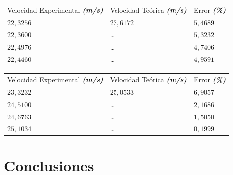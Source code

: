 \documentclass[twocolumn, 12pt]{article}
\newcommand{\bolditalic}[1]{\textbf{\textit{#1}}}
\begin{document}
\begin{table}[H]
    \begin{tabularx}{0.9\linewidth}{|>{\centering\arraybackslash}X|>{\centering\arraybackslash}X|>{\centering\arraybackslash}X|}
        \multicolumn{3}{c}{\large $M_{2}$}                                                                         \\\hline
        Velocidad Experimental \bolditalic{(m/s)} & Velocidad Teórica \bolditalic{(m/s)} & Error \bolditalic{(\%)} \\\hline
        $22,3256$                                 & $23,6172$                            & $5,4689$                \\\hline
        $22,3600$                                 & \dots                                & $5,3232$                \\\hline
        $22,4976$                                 & \dots                                & $4,7406$                \\\hline
        $22,4460$                                 & \dots                                & $4,9591$                \\\hline
    \end{tabularx}
\end{table}

\vspace{-.5cm}

\begin{table}[H]
    \begin{tabularx}{0.9\linewidth}{|>{\centering\arraybackslash}X|>{\centering\arraybackslash}X|>{\centering\arraybackslash}X|}
        \multicolumn{3}{c}{\large $M_{3}$}                                                                         \\\hline
        Velocidad Experimental \bolditalic{(m/s)} & Velocidad Teórica \bolditalic{(m/s)} & Error \bolditalic{(\%)} \\\hline
        $23,3232$                                 & $25,0533$                            & $6,9057$                \\\hline
        $24,5100$                                 & \dots                                & $2,1686$                \\\hline
        $24,6763$                                 & \dots                                & $1,5050$                \\\hline
        $25,1034$                                 & \dots                                & $0,1999$                \\\hline
    \end{tabularx}
\end{table}

\section{Conclusiones}

\printbibliography
\end{document}

